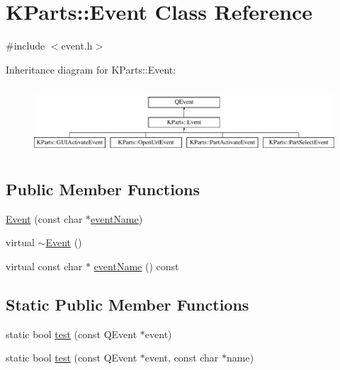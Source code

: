 \hypertarget{classKParts_1_1Event}{\section{K\+Parts\+:\+:Event Class Reference}
\label{classKParts_1_1Event}
}


{\ttfamily \#include $<$event.\+h$>$}

Inheritance diagram for K\+Parts\+:\+:Event\+:\begin{figure}[H]
\begin{center}
\leavevmode
\includegraphics[height=2.560976cm]{classKParts_1_1Event}
\end{center}
\end{figure}
\subsection*{Public Member Functions}
\begin{DoxyCompactItemize}
\item 
\hyperlink{classKParts_1_1Event_af717e4320e2db1ab5973c41381673a4e}{Event} (const char $\ast$\hyperlink{classKParts_1_1Event_aefe2f55deef3f5ffc2de198b955fc453}{event\+Name})
\item 
virtual \hyperlink{classKParts_1_1Event_a5e19e5a883bb39c0ea6053170af67081}{$\sim$\+Event} ()
\item 
virtual const char $\ast$ \hyperlink{classKParts_1_1Event_aefe2f55deef3f5ffc2de198b955fc453}{event\+Name} () const 
\end{DoxyCompactItemize}
\subsection*{Static Public Member Functions}
\begin{DoxyCompactItemize}
\item 
static bool \hyperlink{classKParts_1_1Event_a825b18534ae37dae24f2a2b326db0629}{test} (const Q\+Event $\ast$event)
\item 
static bool \hyperlink{classKParts_1_1Event_a1736144deda3cbb502cb6a9151d3c7cb}{test} (const Q\+Event $\ast$event, const char $\ast$name)
\end{DoxyCompactItemize}


